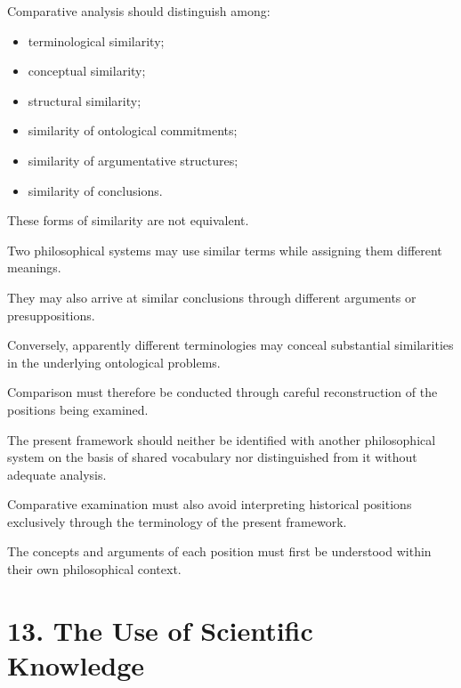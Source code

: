 Comparative analysis should
distinguish among:

\begin{itemize}

    \item terminological similarity;

    \item conceptual similarity;

    \item structural similarity;

    \item similarity of ontological
    commitments;

    \item similarity of argumentative
    structures;

    \item similarity of conclusions.

\end{itemize}

These forms of similarity are
not equivalent.

Two philosophical systems may
use similar terms while assigning
them different meanings.

They may also arrive at similar
conclusions through different
arguments or presuppositions.

Conversely, apparently different
terminologies may conceal
substantial similarities in
the underlying ontological
problems.

Comparison must therefore
be conducted through careful
reconstruction of the positions
being examined.

The present framework should
neither be identified with
another philosophical system
on the basis of shared vocabulary
nor distinguished from it
without adequate analysis.

Comparative examination must
also avoid interpreting historical
positions exclusively through
the terminology of the present
framework.

The concepts and arguments
of each position must first
be understood within their
own philosophical context.


\section*{13. The Use of Scientific Knowledge}

